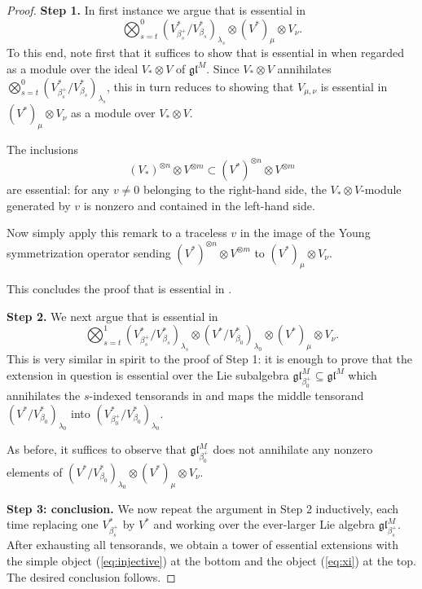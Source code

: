 \documentclass[11pt]{article}
\theoremstyle{plain}
\theoremstyle{nonumberplain}
\theoremstyle{plain}
\theoremstyle{nonumberplain}
\newtheorem{proof}{Proof}
\newcommand\fgl{\mathfrak{gl}}
\begin{document}
\begin{proof}

  {\bf Step 1.} In first instance we argue that  is essential
  in
  \begin{equation}\label{eq:simple'}
    \bigotimes_{s=t}^0 (V^*_{\beta_s^+}/V^*_{\beta_s})_{\lambda_s}\otimes  (V^*)_{\mu}\otimes V_{\nu}.
  \end{equation}
To this end, note first that it suffices to show that 
is essential in  when regarded as a module over the ideal $V_*\otimes V$ of $\fgl^M$. Since $V_*\otimes V$ annihilates $ \bigotimes_{s=t}^0 (V^*_{\beta_s^+}/V^*_{\beta_s})_{\lambda_s}$, this in turn
reduces to showing that $V_{\mu,\nu}$ is essential in
$(V^*)_\mu\otimes V_\nu$ as a module over $V_*\otimes V$.

The inclusions
  \begin{equation*}
    (V_*)^{\otimes n}\otimes V^{\otimes m}\subset (V^*)^{\otimes n}\otimes V^{\otimes m}
  \end{equation*}
  are essential: for any $v\ne 0$ belonging to the right-hand side, the
  $V_*\otimes V$-module generated by $v$ is nonzero and contained
  in the left-hand side.

  Now simply apply this remark to a traceless $v$ in the image of the
  Young symmetrization operator sending
  $(V^*)^{\otimes n}\otimes V^{\otimes m}$ to
  $(V^*)_\mu\otimes V_\nu$.

  This concludes the proof that  is
  essential in .

  \vspace{.5cm}

  {\bf Step 2.} We next argue that  is essential in
  \begin{equation}\label{eq:simple''}
    \bigotimes_{s=t}^1 (V^*_{\beta_s^+}/V^*_{\beta_s})_{\lambda_s}\otimes (V^*/V^*_{\beta_0})_{\lambda_0}\otimes  (V^*)_{\mu}\otimes V_{\nu}.
  \end{equation}
  This is very similar in spirit to the proof of Step 1: it is enough
  to prove that the extension in question is essential over the Lie
  subalgebra $\fgl^M_{\beta_0^{+}}\subseteq \fgl^M$ which annihilates
  the $s$-indexed tensorands in  and maps the middle
  tensorand $(V^*/V^*_{\beta_0})_{\lambda_0}$ into
  $(V^*_{\beta_0^+}/V^*_{\beta_0})_{\lambda_0}$.

  As before, it suffices to observe that $\fgl^M_{\beta_0^+}$ does not
  annihilate any nonzero elements of
  $(V^*/V^*_{\beta_0})_{\lambda_0}\otimes (V^*)_{\mu}\otimes V_{\nu}$.


  \vspace{.5cm}

  {\bf Step 3: conclusion.} We now repeat the argument in Step 2
  inductively, each time replacing one $V^*_{\beta_s^+}$ by $V^*$ and
  working over the ever-larger Lie algebra
  $\fgl^M_{\beta_s^{+}}$.  After exhausting all tensorands, we obtain a tower of essential extensions with the simple object (\ref{eq:injective}) at the bottom and the object (\ref{eq:xi}) at the top.  The desired conclusion follows.
\end{proof}
\end{document}
